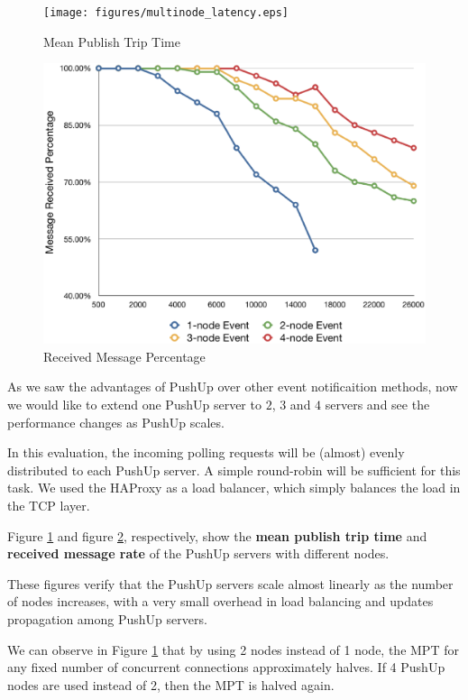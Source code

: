 \begin{figure}[htb!]
\centering%
    \texttt{[image: figures/multinode\_latency.eps]}
    \caption{Mean Publish Trip Time}
    \label{fig:mt_latency}
\end{figure}

\begin{figure}[htb!]
\centering%
    \includegraphics[scale=0.28]{figures/multinode_rate.eps}
    \caption{Received Message Percentage}
    \label{fig:mt_rate}
\end{figure}

As we saw the advantages of PushUp over other event notificaition methods, 
now we would like to extend one PushUp server to $2$,  $3$ and $4$ servers
and see the performance changes as PushUp scales.

In this evaluation, the incoming polling requests will be (almost) evenly 
distributed to each PushUp server. A simple round-robin will be sufficient 
for this task. We used the HAProxy\cite{HAProxy} as a load balancer, which
simply balances the load in the TCP layer.

Figure \ref{fig:mt_latency} and figure \ref{fig:mt_rate}, respectively, show
the {\bf mean publish trip time} and {\bf received message rate} of the 
PushUp servers with different nodes.

These figures verify that the PushUp servers scale almost linearly as the 
number of nodes increases, with a very small overhead in load balancing 
and updates propagation among PushUp servers. 

We can observe in Figure \ref{fig:mt_latency}
that by using 2 nodes instead of 1 node, the MPT for any fixed number of concurrent
connections approximately halves. If 4 PushUp nodes are used instead of 2, then
the MPT is halved again.

